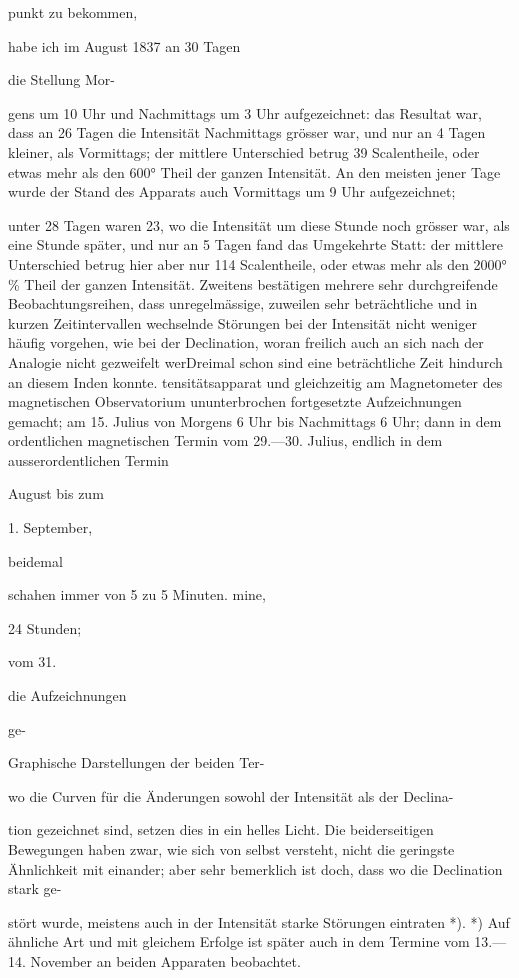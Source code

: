 \documentclass[12pt,a4paper]{article}
\begin{document}
punkt zu bekommen,

habe ich im August 1837 an 30 Tagen

die Stellung Mor-

gens um 10 Uhr und Nachmittags um 3 Uhr aufgezeichnet: das Resultat war, dass an 26 Tagen die Intensität Nachmittags grösser war, und nur an 4 Tagen kleiner, als Vormittags; der mittlere Unterschied betrug 39 Scalentheile, oder etwas mehr als den 600° Theil der ganzen Intensität. An den meisten jener Tage wurde der Stand des Apparats auch Vormittags um 9 Uhr aufgezeichnet;

unter 28 Tagen waren 23, wo die Intensität um diese Stunde noch grösser war, als eine Stunde später, und nur an 5 Tagen fand das Umgekehrte Statt: der mittlere Unterschied betrug hier aber nur 114 Scalentheile, oder etwas mehr als den 2000°\% Theil der ganzen Intensität. Zweitens bestätigen mehrere sehr durchgreifende Beobachtungsreihen, dass unregelmässige, zuweilen sehr beträchtliche und in kurzen Zeitintervallen wechselnde Störungen bei der Intensität nicht weniger häufig vorgehen, wie bei der Declination, woran freilich auch an sich nach der Analogie nicht gezweifelt werDreimal schon sind eine beträchtliche Zeit hindurch an diesem Inden konnte. tensitätsapparat und gleichzeitig am Magnetometer des magnetischen Observatorium ununterbrochen fortgesetzte Aufzeichnungen gemacht; am 15. Julius von Morgens 6 Uhr bis Nachmittags 6 Uhr; dann in dem ordentlichen magnetischen Termin vom 29.—30. Julius, endlich in dem ausserordentlichen Termin

August bis zum

1. September,

beidemal

schahen immer von 5 zu 5 Minuten. mine,

24 Stunden;

vom 31.

die Aufzeichnungen

ge-

Graphische Darstellungen der beiden Ter-

wo die Curven für die Änderungen sowohl der Intensität als der Declina-

tion gezeichnet sind, setzen dies in ein helles Licht. Die beiderseitigen Bewegungen haben zwar, wie sich von selbst versteht, nicht die geringste Ähnlichkeit mit einander; aber sehr bemerklich ist doch, dass wo die Declination stark ge-

stört wurde, meistens auch in der Intensität starke Störungen eintraten *). *) Auf ähnliche Art und mit gleichem Erfolge ist später auch in dem Termine vom 13.—14. November an beiden Apparaten beobachtet.
\end{document}
